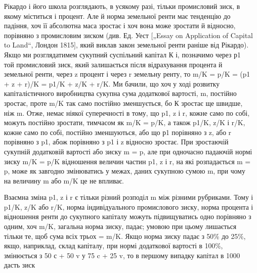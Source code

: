 Рікардо і його школа розглядають, в усякому разі, тільки промисловий
зиск, в якому міститься і процент. Але й норма земельної
ренти має тенденцію до падіння, хоч її абсолютна маса зростає
і хоч вона може зростати й відносно, порівняно з промисловим
зиском (див. Ед. Уест [„Essay on Application of Capital to Land“,
Лондон 1815], який виклав закон земельної ренти раніше від
Рікардо). Якщо ми розглядатимем сукупний суспільний капітал
К і, позначимо через р1 той промисловий зиск, який залишається
після відрахування процента й земельної ренти, через z
процент і через r земельну ренту, то m/K = p/K = (p1 + z + r)/K =
p1/K + z/K + r/K. Ми бачили, що хоч у ході розвитку капіталістичного
виробництва сукупна сума додаткової вартості, m, постійно
зростає, проте m/K так само постійно зменшується, бо К
зростає ще швидше, ніж m. Отже, немає ніякої суперечності
в тому, що p1, z і r, кожне само по собі, можуть постійно зростати,
тимчасом як m/K = p/K, а також p1/K, z/K і r/K, кожне само
по собі, постійно зменшуються, або що р1 порівняно з z, або
r порівняно з p1, абож порівняно з p1 і z відносно зростає.
При зростаючій сукупній додатковій вартості або зиску m = p, але
при одночасно падаючій нормі зиску m/K = p/K відношення величин
частин p1, z і r, на які розпадається m = p, може як завгодно
змінюватись у межах, даних сукупною сумою m, при чому
на величину m або m/K це не впливає.

Взаємна зміна p1, z і r є тільки різний розподіл m між різними
рубриками. Тому і p1/K, z/K або r/K, норма індивідуального
промислового зиску, норма процента і відношення ренти до
сукупного капіталу можуть підвищуватись одно порівняно з одним,
хоч m/K, загальна норма зиску, падає; умовою при цьому
лишається тільки те, щоб сума всіх трьох = m/K. Якщо норма
зиску падає з 50\% до 25\%, якщо, наприклад, склад капіталу,
при нормі додаткової вартості в 100\%, змінюється з 50 с + 50 v
у 75 c + 25 v, то в першому випадку капітал в 1000 дасть зиск
\parbreak{}  %
